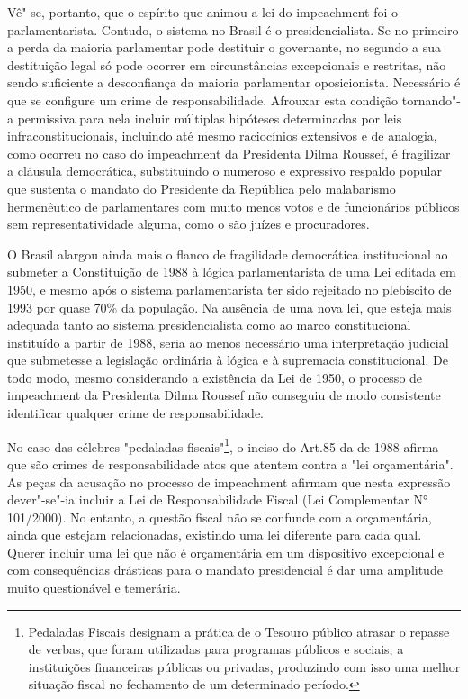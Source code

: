 Vê"-se, portanto, que o espírito que animou a lei do impeachment foi o
parlamentarista. Contudo, o sistema no Brasil é o presidencialista. Se
no primeiro a perda da maioria parlamentar pode destituir o governante,
no segundo a sua destituição legal só pode ocorrer em circunstâncias
excepcionais e restritas, não sendo suficiente a desconfiança da maioria
parlamentar oposicionista. Necessário é que se configure um crime de
responsabilidade. Afrouxar esta condição tornando"-a permissiva para nela
incluir múltiplas hipóteses determinadas por leis infraconstitucionais,
incluindo até mesmo raciocínios extensivos e de analogia, como ocorreu
no caso do impeachment da Presidenta Dilma Roussef, é fragilizar a
cláusula democrática, substituindo o numeroso e expressivo respaldo
popular que sustenta o mandato do Presidente da República pelo
malabarismo hermenêutico de parlamentares com muito menos votos e de
funcionários públicos sem representatividade alguma, como o são juízes e
procuradores.

O Brasil alargou ainda mais o flanco de fragilidade democrática
institucional ao submeter a Constituição de 1988 à lógica
parlamentarista de uma Lei editada em 1950, e mesmo após o sistema
parlamentarista ter sido rejeitado no plebiscito de 1993 por quase 70\%
da população. Na ausência de uma nova lei, que esteja mais adequada
tanto ao sistema presidencialista como ao marco constitucional
instituído a partir de 1988, seria ao menos necessário uma interpretação
judicial que submetesse a legislação ordinária à lógica e à supremacia
constitucional. De todo modo, mesmo considerando a existência da Lei de
1950, o processo de impeachment da Presidenta Dilma Roussef não
conseguiu de modo consistente identificar qualquer crime de
responsabilidade.

No caso das célebres "pedaladas fiscais"\footnote{Pedaladas Fiscais
  designam a prática de o Tesouro público atrasar o repasse de verbas,
  que foram utilizadas para programas públicos e sociais, a instituições
  financeiras públicas ou privadas, produzindo com isso uma melhor
  situação fiscal no fechamento de um determinado período.}, o inciso 
do Art.85 da  de 1988 afirma que são crimes de responsabilidade atos
que atentem contra a "lei orçamentária". As peças da acusação no
processo de impeachment afirmam que nesta expressão dever"-se"-ia incluir
a Lei de Responsabilidade Fiscal (Lei Complementar N° 101/2000). No
entanto, a questão fiscal não se confunde com a orçamentária, ainda que
estejam relacionadas, existindo uma lei diferente para cada qual. Querer
incluir uma lei que não é orçamentária em um dispositivo excepcional e
com consequências drásticas para o mandato presidencial é dar uma
amplitude muito questionável e temerária.

